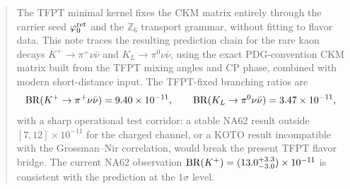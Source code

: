 
\maketitle

\begin{abstract}
The TFPT minimal kernel fixes the CKM matrix entirely through the carrier seed
$\phiz$ and the $\mathbb Z_6$ transport grammar, without fitting to flavor data.
This note traces the resulting prediction chain for the rare
kaon decays $K^+\to\pi^+\nu\bar\nu$ and $K_L\to\pi^0\nu\bar\nu$,
using the exact PDG-convention CKM matrix built from the TFPT mixing
angles and CP phase, combined with modern short-distance input.
The TFPT-fixed branching ratios are
\[
\BR(K^+\to\pi^+\nu\bar\nu)=\num{9.40e-11},
\qquad
\BR(K_L\to\pi^0\nu\bar\nu)=\num{3.47e-11},
\]
with a sharp operational test corridor: a stable NA62 result outside
$[7,12]\times 10^{-11}$ for the charged channel, or a KOTO result
incompatible with the Grossman--Nir correlation, would break the
present TFPT flavor bridge. The current NA62 observation
$\BR(K^+)=(13.0^{+3.3}_{-3.0})\times 10^{-11}$ is consistent with
the prediction at the $1\sigma$ level.
\end{abstract}

\tableofcontents

\bigskip

